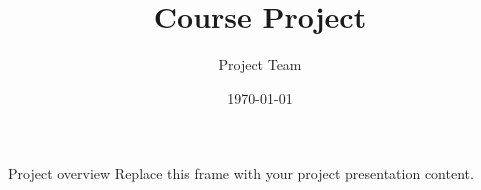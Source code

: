 \documentclass[aspectratio=169]{beamer}
\title{Course Project}
\author{Project Team}
\date{\today}
\begin{document}
\maketitle

\begin{frame}{Project overview}
Replace this frame with your project presentation content.
\end{frame}
\end{document}
